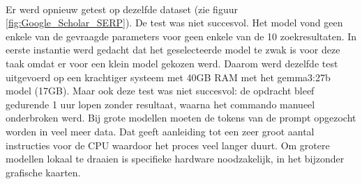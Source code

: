 \\
Er werd opnieuw getest op dezelfde dataset  (zie figuur \ref{fig:Google_Scholar_SERP}). De test was niet succesvol. Het model vond geen enkele van de gevraagde parameters voor geen enkele van de 10 zoekresultaten.
In eerste instantie werd gedacht dat het geselecteerde model te zwak is voor deze taak omdat er voor een klein model gekozen werd. Daarom werd dezelfde test uitgevoerd op een krachtiger systeem met 40GB RAM met het gemma3:27b model (17GB). Maar ook deze test was niet succesvol: de opdracht bleef gedurende 1 uur lopen zonder resultaat, waarna het commando manueel onderbroken werd. Bij grote modellen moeten de tokens van de prompt opgezocht worden in veel meer data. Dat geeft aanleiding tot een zeer groot aantal instructies voor de CPU waardoor het proces veel langer duurt. Om grotere modellen lokaal te draaien is specifieke hardware noodzakelijk, in het bijzonder grafische kaarten. 
